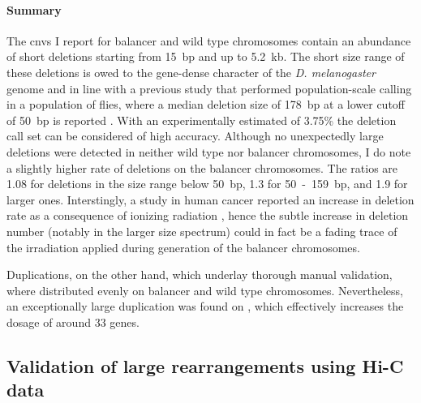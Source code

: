 \paragraph{Summary} The \acp{cnv} I report for balancer and wild type
chromosomes contain an abundance of short deletions starting from 15~bp and up
to 5.2~kb. The short size range of these deletions is owed to the gene-dense
character of the \textit{D. melanogaster} genome and in line with a previous
study that performed population-scale \sv calling in a population of flies,
where a median deletion size of 178~bp at a lower cutoff of 50~bp is reported
\citep{Zichner2013}.
With an experimentally estimated \fdr of 3.75\% the deletion call set can be
considered of high accuracy. Although no unexpectedly large deletions were
detected in neither wild type nor balancer chromosomes, I do note a slightly
higher rate of deletions on the balancer chromosomes. The ratios are 1.08 for
deletions in the size range below 50~bp, 1.3 for 50~-~159~bp, and 1.9 for larger
ones. Interstingly, a study in human cancer reported an increase in deletion
rate as a consequence of ionizing radiation \citep{Behjati2016}, hence the
subtle increase in deletion number (notably in the larger size spectrum) could
in fact be a fading trace of the irradiation applied during generation of the
balancer chromosomes.

Duplications, on the other hand, which underlay thorough manual validation,
where distributed evenly on balancer and wild type chromosomes. Nevertheless,
an exceptionally large duplication was found on \cyo, which effectively
increases the dosage of around 33 genes.






\subsection{Validation of large rearrangements using Hi-C data}
\label{sec:balancer_hic_svs}

